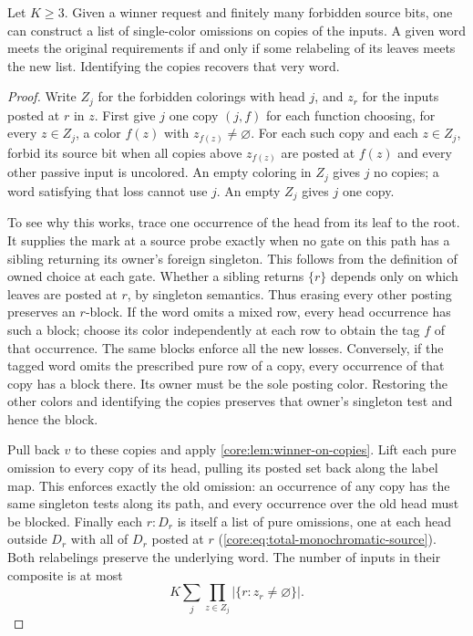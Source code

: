 \begin{theorem}
\label{core:thm:pure-omission-reduction}
Let $K\ge3$. Given a winner request and finitely many forbidden source
bits, one can construct a list of single-color omissions on copies of
the inputs. A given word meets the original requirements if and only
if some relabeling of its leaves meets the new list. Identifying the
copies recovers that very word.
\end{theorem}
\begin{proof}
Write $Z_j$ for the forbidden colorings with head $j$, and $z_r$ for
the inputs posted at $r$ in $z$. First give $j$ one copy $(j,f)$ for
each function choosing, for every $z\in Z_j$, a color $f(z)$ with
$z_{f(z)}\ne\varnothing$. For each such copy and each $z\in Z_j$,
forbid its source bit when all copies above $z_{f(z)}$ are posted at
$f(z)$ and every other passive input is uncolored. An empty coloring
in $Z_j$ gives $j$ no copies; a word satisfying that loss cannot use
$j$. An empty $Z_j$ gives $j$ one copy.

To see why this works, trace one occurrence of the head from its leaf
to the root. It supplies the mark at a source probe exactly when no
gate on this path has a sibling returning its owner's foreign singleton.
This follows from the definition of owned choice at each gate. Whether
a sibling returns $\{r\}$ depends only on which leaves are posted at
$r$, by singleton semantics. Thus erasing every other posting preserves
an $r$-block. If the word omits a mixed row, every head occurrence has
such a block; choose its color independently at each row to obtain the
tag $f$ of that occurrence. The same blocks enforce all the new losses.
Conversely, if the tagged word omits the prescribed pure row of a
copy, every occurrence of that copy has a block there. Its owner must
be the sole posting color. Restoring the other colors and identifying
the copies preserves that owner's singleton test and hence the block.

Pull back $v$ to these copies and apply \cref{core:lem:winner-on-copies}.
Lift each pure omission to every copy of its head, pulling its posted
set back along the label map. This enforces exactly the old omission:
an occurrence of any copy has the same singleton tests along its path,
and every occurrence over the old head must be blocked. Finally each
$r:D_r$ is itself a list of pure omissions, one at each head outside
$D_r$ with all of $D_r$ posted at $r$
(\cref{core:eq:total-monochromatic-source}). Both relabelings preserve
the underlying word. The number of inputs in their composite is at most
\[
 K\sum_j\prod_{z\in Z_j}|\{r:z_r\ne\varnothing\}|.
\]
\end{proof}

